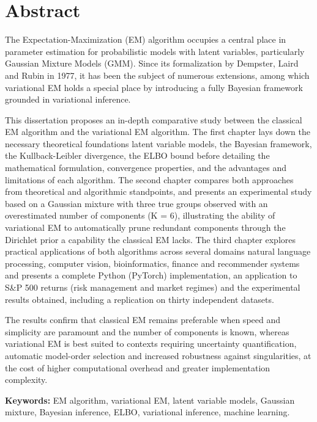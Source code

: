 \chapter*{Abstract}
The Expectation-Maximization (EM) algorithm occupies a central place in parameter estimation for probabilistic models with latent variables, particularly Gaussian Mixture Models (GMM). Since its formalization by Dempster, Laird and Rubin in 1977, it has been the subject of numerous extensions, among which variational EM holds a special place by introducing a fully Bayesian framework grounded in variational inference.

This dissertation proposes an in-depth comparative study between the classical EM algorithm and the variational EM algorithm. The first chapter lays down the necessary theoretical foundations  latent variable models, the Bayesian framework, the Kullback-Leibler divergence, the ELBO bound  before detailing the mathematical formulation, convergence properties, and the advantages and limitations of each algorithm. The second chapter compares both approaches from theoretical and algorithmic standpoints, and presents an experimental study based on a Gaussian mixture with three true groups observed with an overestimated number of components (K = 6), illustrating the ability of variational EM to automatically prune redundant components through the Dirichlet prior  a capability the classical EM lacks. The third chapter explores practical applications of both algorithms across several domains  natural language processing, computer vision, bioinformatics, finance and recommender systems  and presents a complete Python (PyTorch) implementation, an application to S\&P 500 returns (risk management and market regimes) and the experimental results obtained, including a replication on thirty independent datasets.

The results confirm that classical EM remains preferable when speed and simplicity are paramount and the number of components is known, whereas variational EM is best suited to contexts requiring uncertainty quantification, automatic model-order selection and increased robustness against singularities, at the cost of higher computational overhead and greater implementation complexity.

\textbf{Keywords: }EM algorithm, variational EM, latent variable models, Gaussian mixture, Bayesian inference, ELBO, variational inference, machine learning.


